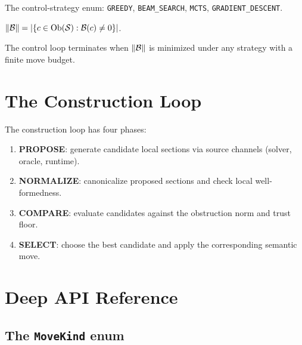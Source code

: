 \documentclass[11pt]{article}
\newcommand{\norm}[1]{\lVert #1 \rVert}
\newcommand{\obstrnorm}{\norm{\obstr}}
\begin{document}
\begin{definition}\label{def:ctrl}
The control-strategy enum: \texttt{GREEDY},
\texttt{BEAM\_SEARCH}, \texttt{MCTS},
\texttt{GRADIENT\_DESCENT}.
\end{definition}

\begin{definition}\label{def:obstr-norm}
$\obstrnorm = |\{c \in \Ob(\Site) : \obstr(c) \neq 0\}|$.
\end{definition}

\begin{theorem}\label{thm:termination}
The control loop terminates when $\obstrnorm$ is minimized
under any strategy with a finite move budget.
\end{theorem}


\section{The Construction Loop}\label{sec:construction}

The construction loop has four phases:

\begin{enumerate}[nosep]
  \item \textbf{PROPOSE}: generate candidate local sections
        via source channels (solver, oracle, runtime).
  \item \textbf{NORMALIZE}: canonicalize proposed sections
        and check local well-formedness.
  \item \textbf{COMPARE}: evaluate candidates against the
        obstruction norm and trust floor.
  \item \textbf{SELECT}: choose the best candidate and
        apply the corresponding semantic move.
\end{enumerate}


\section{Deep \JuGeo{} API Reference}\label{sec:api}

\subsection{The \texttt{MoveKind} enum}
\end{document}
